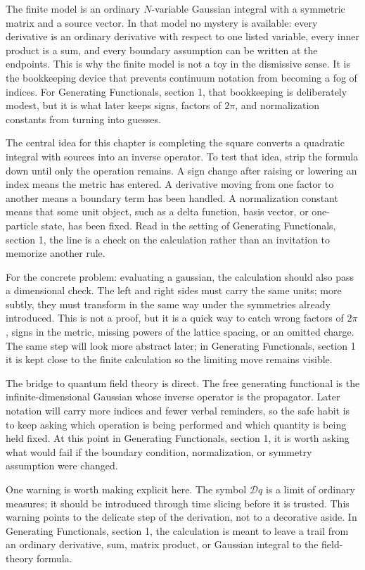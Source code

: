 The finite model is an ordinary \(N\)-variable Gaussian integral with a symmetric matrix and a source vector.  In that model no mystery is available: every derivative is an ordinary derivative with respect to one listed variable, every inner product is a sum, and every boundary assumption can be written at the endpoints.  This is why the finite model is not a toy in the dismissive sense.  It is the bookkeeping device that prevents continuum notation from becoming a fog of indices.  For Generating Functionals, section 1, that bookkeeping is deliberately modest, but it is what later keeps signs, factors of \(2\pi\), and normalization constants from turning into guesses.

The central idea for this chapter is completing the square converts a quadratic integral with sources into an inverse operator.  To test that idea, strip the formula down until only the operation remains.  A sign change after raising or lowering an index means the metric has entered.  A derivative moving from one factor to another means a boundary term has been handled.  A normalization constant means that some unit object, such as a delta function, basis vector, or one-particle state, has been fixed.  Read in the setting of Generating Functionals, section 1, the line is a check on the calculation rather than an invitation to memorize another rule.

For the concrete problem: evaluating a gaussian, the calculation should also pass a dimensional check.  The left and right sides must carry the same units; more subtly, they must transform in the same way under the symmetries already introduced.  This is not a proof, but it is a quick way to catch wrong factors of \(2\pi\), signs in the metric, missing powers of the lattice spacing, or an omitted charge.  The same step will look more abstract later; in Generating Functionals, section 1 it is kept close to the finite calculation so the limiting move remains visible.

The bridge to quantum field theory is direct.  The free generating functional is the infinite-dimensional Gaussian whose inverse operator is the propagator.  Later notation will carry more indices and fewer verbal reminders, so the safe habit is to keep asking which operation is being performed and which quantity is being held fixed.  At this point in Generating Functionals, section 1, it is worth asking what would fail if the boundary condition, normalization, or symmetry assumption were changed.

One warning is worth making explicit here.  The symbol \(\mathcal D q\) is a limit of ordinary measures; it should be introduced through time slicing before it is trusted.  This warning points to the delicate step of the derivation, not to a decorative aside.  In Generating Functionals, section 1, the calculation is meant to leave a trail from an ordinary derivative, sum, matrix product, or Gaussian integral to the field-theory formula.


